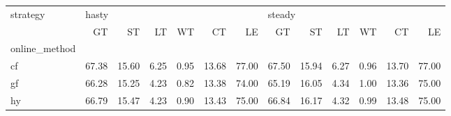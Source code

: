 \begin{tabular}{lrrrrrrrrrrrr}
\toprule
strategy & \multicolumn{6}{l}{hasty} & \multicolumn{6}{l}{steady} \\
{} &    GT &    ST &   LT &   WT &    CT &    LE &     GT &    ST &   LT &   WT &    CT &    LE \\
online\_method &       &       &      &      &       &       &        &       &      &      &       &       \\
\midrule
cf            & 67.38 & 15.60 & 6.25 & 0.95 & 13.68 & 77.00 &  67.50 & 15.94 & 6.27 & 0.96 & 13.70 & 77.00 \\
gf            & 66.28 & 15.25 & 4.23 & 0.82 & 13.38 & 74.00 &  65.19 & 16.05 & 4.34 & 1.00 & 13.36 & 75.00 \\
hy            & 66.79 & 15.47 & 4.23 & 0.90 & 13.43 & 75.00 &  66.84 & 16.17 & 4.32 & 0.99 & 13.48 & 75.00 \\
\bottomrule
\end{tabular}
